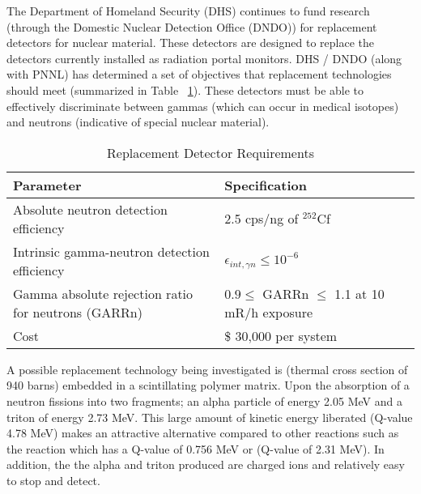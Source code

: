 \documentclass[draftcls,onecolumn]{IEEEtran}
\begin{document}
The Department of Homeland Security (DHS) continues to fund research (through the Domestic Nuclear Detection Office (DNDO)) for replacement detectors for nuclear material.
These detectors are designed to replace the  detectors currently installed as radiation portal monitors.
DHS / DNDO (along with PNNL) has determined a set of objectives that replacement technologies should meet (summarized in Table ~\ref{tab:DHSCriteria}).
These detectors must be able to effectively discriminate between gammas (which can occur in medical isotopes) and neutrons (indicative of special nuclear material).
\begin{table}[h]
    \caption{Replacement Detector Requirements  }
	\centering
	\begin{tabular}{p{} | p{} }
	Parameter & Specification \\
	\hline
	\hline
	Absolute neutron detection efficiency & 2.5 cps/ng of ${}^{252}$Cf \\
	Intrinsic gamma-neutron detection efficiency & $ \epsilon_{int,\gamma n}\leq 10^{-6}$ \\
	Gamma absolute rejection ratio for neutrons (GARRn) & $ 0.9 \leq \text{ GARRn }\leq$ 1.1 at 10 mR/h exposure \\
	Cost &  \$ 30,000 per system \\
	\hline
	\end{tabular}
    \label{tab:DHSCriteria}
\end{table}

A possible replacement technology being investigated is  (thermal cross section of 940 barns) embedded in a scintillating polymer matrix.
Upon the absorption of a neutron  fissions into two fragments; an alpha particle of energy 2.05 MeV and a triton of energy 2.73 MeV.
This large amount of kinetic energy liberated (Q-value 4.78 MeV) makes  an attractive alternative compared to other reactions such as the  reaction which has a Q-value of 0.756 MeV or  (Q-value of 2.31 MeV).
In addition, the the alpha and triton produced are charged ions and relatively easy to stop and detect.
\end{document}
